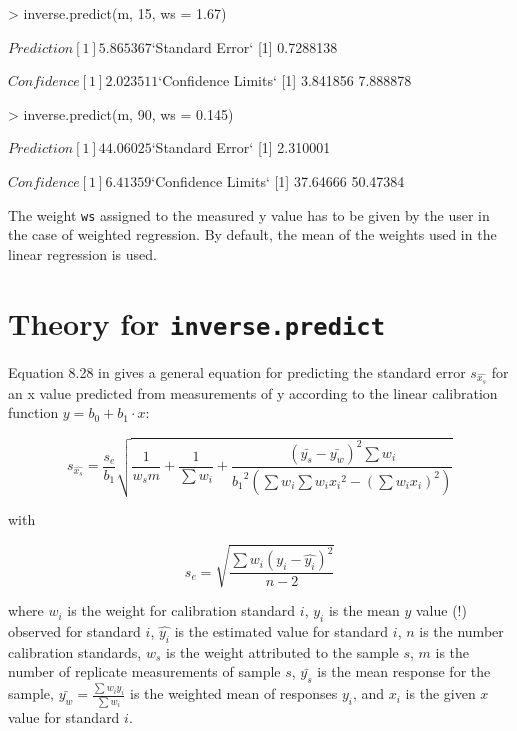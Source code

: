 \documentclass[a4paper]{article}
\begin{document}
\begin{Schunk}
\begin{Sinput}
> inverse.predict(m, 15, ws = 1.67)
\end{Sinput}
\begin{Soutput}
$Prediction
[1] 5.865367

$`Standard Error`
[1] 0.7288138

$Confidence
[1] 2.023511

$`Confidence Limits`
[1] 3.841856 7.888878
\end{Soutput}
\begin{Sinput}
> inverse.predict(m, 90, ws = 0.145)
\end{Sinput}
\begin{Soutput}
$Prediction
[1] 44.06025

$`Standard Error`
[1] 2.310001

$Confidence
[1] 6.41359

$`Confidence Limits`
[1] 37.64666 50.47384
\end{Soutput}
\end{Schunk}

The weight \texttt{ws} assigned to the measured y value has to be 
given by the user in the case of weighted regression. By default, 
the mean of the weights used in the linear regression is used.

\section*{Theory for \texttt{inverse.predict}}
Equation 8.28 in \cite{massart97} gives a general equation for predicting the
standard error $s_{\hat{x_s}}$ for an x value predicted from measurements of y
according to the linear calibration function $ y = b_0 + b_1 \cdot x$:

\begin{equation}
s_{\hat{x_s}} = \frac{s_e}{b_1} \sqrt{\frac{1}{w_s m} + \frac{1}{\sum{w_i}} +
    \frac{(\bar{y_s} - \bar{y_w})^2 \sum{w_i}}
        {{b_1}^2 \left( \sum{w_i} \sum{w_i {x_i}^2} - 
            {\left( \sum{ w_i x_i } \right)}^2 \right) }}
\end{equation}

with

\begin{equation}
s_e = \sqrt{ \frac{\sum w_i (y_i - \hat{y_i})^2}{n - 2}}
\end{equation}

where $w_i$ is the weight for calibration standard $i$, $y_i$ is the mean $y$
value (!) observed for standard $i$, $\hat{y_i}$ is the estimated value for
standard $i$, $n$ is the number calibration standards, $w_s$ is the weight
attributed to the sample $s$, $m$ is the number of replicate measurements of
sample $s$, $\bar{y_s}$ is the mean response for the sample, 
$\bar{y_w} = \frac{\sum{w_i y_i}}{\sum{w_i}}$ is the weighted mean of responses
$y_i$, and $x_i$ is the given $x$ value for standard $i$.
\end{document}

